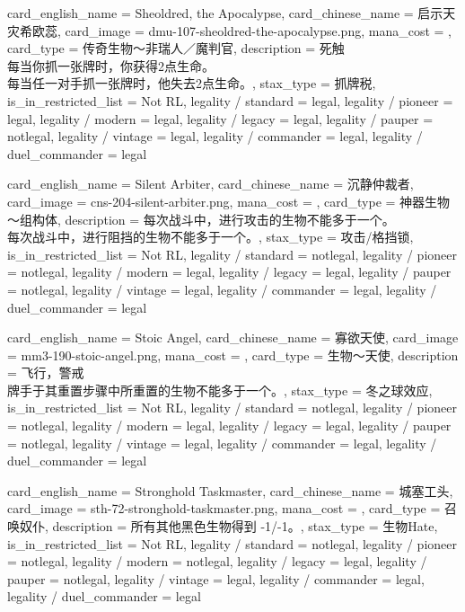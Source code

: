 \documentclass[lang = cn, color = black, 10pt]{AllThatStax}
\begin{document}
\card
{
	card_english_name = {Sheoldred, the Apocalypse},
	card_chinese_name = {启示天灾希欧蕊},
	card_image = dmu-107-sheoldred-the-apocalypse.png,
	mana_cost = ,
	card_type = 传奇生物～非瑞人／魔判官,
	description = {死触\\
每当你抓一张牌时，你获得2点生命。\\
每当任一对手抓一张牌时，他失去2点生命。},
	stax_type = 抓牌税,
	is_in_restricted_list = Not RL,
	legality / standard = legal,
	legality / pioneer = legal,
	legality / modern = legal,
	legality / legacy = legal,
	legality / pauper = notlegal,
	legality / vintage = legal,
	legality / commander = legal,
	legality / duel_commander = legal
}

\card
{
	card_english_name = {Silent Arbiter},
	card_chinese_name = {沉静仲裁者},
	card_image = cns-204-silent-arbiter.png,
	mana_cost = ,
	card_type = 神器生物～组构体,
	description = {每次战斗中，进行攻击的生物不能多于一个。\\
每次战斗中，进行阻挡的生物不能多于一个。},
	stax_type = 攻击/格挡锁,
	is_in_restricted_list = Not RL,
	legality / standard = notlegal,
	legality / pioneer = notlegal,
	legality / modern = legal,
	legality / legacy = legal,
	legality / pauper = notlegal,
	legality / vintage = legal,
	legality / commander = legal,
	legality / duel_commander = legal
}

\card
{
	card_english_name = {Stoic Angel},
	card_chinese_name = {寡欲天使},
	card_image = mm3-190-stoic-angel.png,
	mana_cost = ,
	card_type = 生物～天使,
	description = {飞行，警戒\\
牌手于其重置步骤中所重置的生物不能多于一个。},
	stax_type = 冬之球效应,
	is_in_restricted_list = Not RL,
	legality / standard = notlegal,
	legality / pioneer = notlegal,
	legality / modern = legal,
	legality / legacy = legal,
	legality / pauper = notlegal,
	legality / vintage = legal,
	legality / commander = legal,
	legality / duel_commander = legal
}

\card
{
	card_english_name = {Stronghold Taskmaster},
	card_chinese_name = {城塞工头},
	card_image = sth-72-stronghold-taskmaster.png,
	mana_cost = ,
	card_type = 召唤奴仆,
	description = {所有其他黑色生物得到 -1/-1。},
	stax_type = 生物Hate,
	is_in_restricted_list = Not RL,
	legality / standard = notlegal,
	legality / pioneer = notlegal,
	legality / modern = notlegal,
	legality / legacy = legal,
	legality / pauper = notlegal,
	legality / vintage = legal,
	legality / commander = legal,
	legality / duel_commander = legal
}
\end{document}

